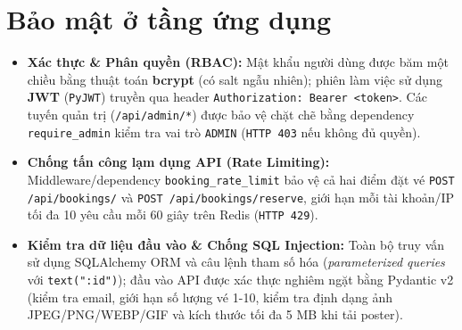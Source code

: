 \section{Bảo mật ở tầng ứng dụng}
\begin{itemize}[leftmargin=1.5em]
  \item \textbf{Xác thực \& Phân quyền (RBAC):} Mật khẩu người dùng được băm một chiều bằng thuật toán \textbf{bcrypt} (có salt ngẫu nhiên); phiên làm việc sử dụng \textbf{JWT} (\texttt{PyJWT}) truyền qua header \texttt{Authorization: Bearer <token>}. Các tuyến quản trị (\texttt{/api/admin/*}) được bảo vệ chặt chẽ bằng dependency \texttt{require\_admin} kiểm tra vai trò \texttt{ADMIN} (\texttt{HTTP 403} nếu không đủ quyền).
  \item \textbf{Chống tấn công lạm dụng API (Rate Limiting):} Middleware/dependency \texttt{booking\_rate\_limit} bảo vệ cả hai điểm đặt vé \texttt{POST /api/bookings/} và \texttt{POST /api/bookings/reserve}, giới hạn mỗi tài khoản/IP tối đa 10 yêu cầu mỗi 60 giây trên Redis (\texttt{HTTP 429}).
  \item \textbf{Kiểm tra dữ liệu đầu vào \& Chống SQL Injection:} Toàn bộ truy vấn sử dụng SQLAlchemy ORM và câu lệnh tham số hóa (\textit{parameterized queries} với \texttt{text(":id")}); đầu vào API được xác thực nghiêm ngặt bằng Pydantic v2 (kiểm tra email, giới hạn số lượng vé 1-10, kiểm tra định dạng ảnh JPEG/PNG/WEBP/GIF và kích thước tối đa 5 MB khi tải poster).
\end{itemize}
